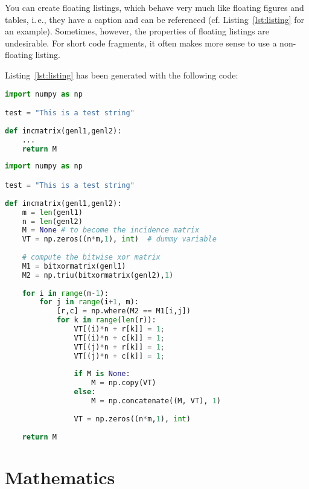 You can create floating listings, which behave very much like floating figures and tables, i.\,e., they have a caption and can be referenced (cf. Listing~\ref{lst:listing} for an example). Sometimes, however, the properties of floating listings are undesirable. For short code fragments, it often makes more sense to use a non-floating listing.

Listing~\ref{lst:listing} has been generated with the following code:
\begin{latex}
\begin{lstlisting}[language=Python,float=t,
  caption={This is an example of syntax highlighting of
  Python code with a relatively long caption},label={lst:listing}]
import numpy as np

test = "This is a test string"
 
def incmatrix(genl1,genl2):
    ...
    return M
\end{lstlisting}
\end{latex}

\begin{lstlisting}[language=Python,float=t,
  caption={This is an example of syntax highlighting of
  Python code with a relatively long caption},label={lst:listing}]
import numpy as np

test = "This is a test string"
 
def incmatrix(genl1,genl2):
    m = len(genl1)
    n = len(genl2)
    M = None # to become the incidence matrix
    VT = np.zeros((n*m,1), int)  # dummy variable
 
    # compute the bitwise xor matrix
    M1 = bitxormatrix(genl1)
    M2 = np.triu(bitxormatrix(genl2),1) 
 
    for i in range(m-1):
        for j in range(i+1, m):
            [r,c] = np.where(M2 == M1[i,j])
            for k in range(len(r)):
                VT[(i)*n + r[k]] = 1;
                VT[(i)*n + c[k]] = 1;
                VT[(j)*n + r[k]] = 1;
                VT[(j)*n + c[k]] = 1;
 
                if M is None:
                    M = np.copy(VT)
                else:
                    M = np.concatenate((M, VT), 1)
 
                VT = np.zeros((n*m,1), int)
 
    return M
\end{lstlisting}


\section{Mathematics}


